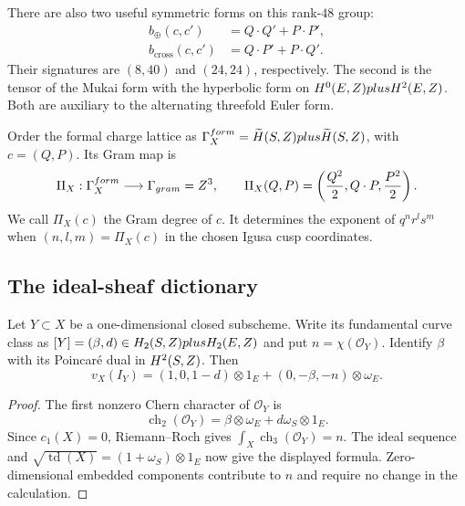 There are also two useful symmetric forms on this rank-$48$ group:
\[
\begin{aligned}
b_{\oplus}(c,c')&=Q\cdot Q'+P\cdot P',\\
b_{\mathrm{cross}}(c,c')&=Q\cdot P'+P\cdot Q'.
\end{aligned}
\]
Their signatures are $(8,40)$ and $(24,24)$, respectively.  The
second is the tensor of the Mukai form with the hyperbolic form on
$H^0(E,Z)plus H^2(E,Z)$.  Both are auxiliary to the alternating
threefold Euler form.

\begin{definition}
\label{def:gram-degree-projection-appendixC}
Order the formal charge lattice as
$\Gamma_X^{form}=\widetilde H(S,Z)plus\widetilde H(S,Z)$,
with $c=(Q,P)$.  Its Gram map is
\[
\Pi_X:\Gamma_X^{form}\longrightarrow\Gamma_{gram}
=Z^3,\qquad
\Pi_X(Q,P)=\left(\frac{Q^2}{2},Q\cdot P,\frac{P^2}{2}\right).
\]
We call $\Pi_X(c)$ the Gram degree of $c$.  It determines the
exponent of $q^nr^ls^m$ when $(n,l,m)=\Pi_X(c)$ in the chosen
Igusa cusp coordinates.
\end{definition}

\subsection{The ideal-sheaf dictionary}
\label{subsec:d6-d2-d0-dictionary-appendixC}

\begin{theorem}
\label{thm:mukai-vector-ideal-sheaf-threefold}
Let $Y\subset X$ be a one-dimensional closed subscheme.  Write its
fundamental curve class as
$[Y]=(\beta,d)\in H_2(S,Z)plus H_2(E,Z)$ and put
$n=\chi(\mathcal O_Y)$.  Identify $\beta$ with its Poincar\'e dual
in $H^2(S,Z)$.  Then
\[
v_X(I_Y)=(1,0,1-d)\otimes1_E+(0,-\beta,-n)\otimes\omega_E.
\]
\end{theorem}

\begin{proof}
The first nonzero Chern character of $\mathcal O_Y$ is
\[
\operatorname{ch}_2(\mathcal O_Y)
=\beta\otimes\omega_E+d\omega_S\otimes1_E.
\]
Since $c_1(X)=0$, Riemann--Roch gives
$\int_X\operatorname{ch}_3(\mathcal O_Y)=n$.
The ideal sequence and $\sqrt{\operatorname{td}(X)}
=(1+\omega_S)\otimes1_E$ now give the displayed formula.
Zero-dimensional embedded components contribute to $n$ and require
no change in the calculation.
\end{proof}

